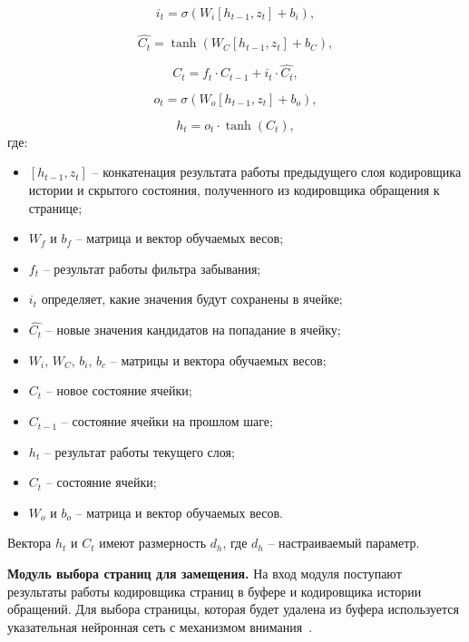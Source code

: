 \begin{equation}\label{formula:lstm_enc_2}
	i_t = \sigma(W_i[h_{t-1}, z_t] + b_i),
\end{equation}

\begin{equation}\label{formula:lstm_enc_3}
	\hat{C_t} = \tanh(W_C[h_{t-1}, z_t] + b_C),
\end{equation}

\begin{equation}\label{formula:lstm_enc_4}
	C_t = f_t \cdot C_{t-1} + i_t \cdot \hat{C_t},
\end{equation}

\begin{equation}\label{formula:lstm_enc_5}
	o_t = \sigma(W_o[h_{t-1}, z_t] + b_o),
\end{equation}

\begin{equation}\label{formula:lstm_enc_6}
	h_t = o_t \cdot \tanh(C_t),
\end{equation}
где:
\begin{itemize}
	\item $[h_{t-1}, z_t]$ -- конкатенация результата работы предыдущего слоя кодировщика истории и скрытого состояния, полученного из кодировщика обращения к странице;
	\item $W_f$ и $b_f$ -- матрица и вектор обучаемых весов;
	\item $f_t$ -- результат работы фильтра забывания;
	\item $i_t$ определяет, какие значения будут сохранены в ячейке;
	\item $\hat{C_t}$ -- новые значения кандидатов на попадание в ячейку;
	\item $W_i$, $W_C$, $b_i$, $b_c$ -- матрицы и вектора обучаемых весов;
	\item $C_t$ -- новое состояние ячейки;
	\item $C_{t-1}$ -- состояние ячейки на прошлом шаге;
	\item $h_t$ -- результат работы текущего слоя;
	\item $C_t$ -- состояние ячейки;
	\item $W_o$ и $b_o$ -- матрица и вектор обучаемых весов.
\end{itemize}
Вектора $h_t$ и $C_t$ имеют размерность $d_h$, где $d_h$ -- настраиваемый параметр.

\textbf{Модуль выбора страниц для замещения.}
На вход модуля поступают результаты работы кодировщика страниц в буфере и кодировщика истории обращений.
Для выбора страницы, которая будет удалена из буфера используется указательная нейронная сеть с механизмом внимания~\cite{vinyals2015pointer}.

